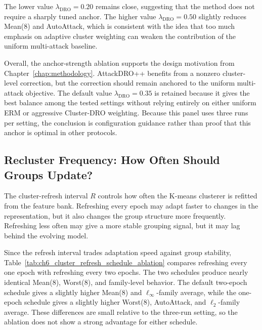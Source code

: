 The lower value
$\lambda_{\mathrm{DRO}}=0.20$ remains close, suggesting that the method does not
require a sharply tuned anchor. The higher value $\lambda_{\mathrm{DRO}}=0.50$
slightly reduces Mean(8) and AutoAttack, which is consistent with the idea that
too much emphasis on adaptive cluster weighting can weaken the contribution of
the uniform multi-attack baseline.

Overall, the anchor-strength ablation supports the design motivation from
Chapter~\ref{chap:methodology}. AttackDRO++ benefits from a nonzero
cluster-level correction, but the correction should remain anchored to the
uniform multi-attack objective. The default value
$\lambda_{\mathrm{DRO}}=0.35$ is retained because it gives the best balance
among the tested settings without relying entirely on either uniform ERM or
aggressive Cluster-DRO weighting. Because this panel uses three runs per
setting, the conclusion is configuration guidance rather than proof that this
anchor is optimal in other protocols.

\subsection{Recluster Frequency: How Often Should Groups Update?}
\label{subsec:ch6_ablation_recluster_frequency}

The cluster-refresh interval $R$ controls how often the K-means clusterer is
refitted from the feature bank. Refreshing every epoch may adapt faster to
changes in the representation, but it also changes the group structure more
frequently. Refreshing less often may give a more stable grouping signal, but it
may lag behind the evolving model.

Since the refresh interval trades adaptation speed against group stability,
Table~\ref{tab:ch6_cluster_refresh_schedule_ablation} compares refreshing every
one epoch with refreshing every two epochs. The two schedules produce nearly
identical Mean(8), Worst(8), and family-level behavior. The default two-epoch
schedule gives a slightly higher Mean(8) and $\ell_\infty$-family average, while
the one-epoch schedule gives a slightly higher Worst(8), AutoAttack, and
$\ell_2$-family average. These differences are small relative to the
three-run setting, so the ablation does not show a strong advantage for either
schedule.

